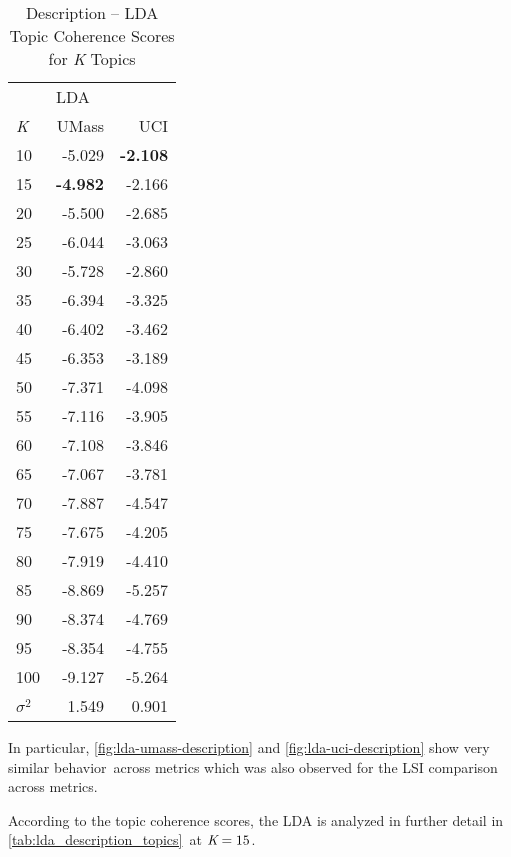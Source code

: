 \documentclass[letterpaper,12pt]{article}
\begin{document}
\begin{table}
	\caption{\label{tab:lda_description_tc} Description -- LDA Topic Coherence Scores for \emph{K} Topics}
	\begin{center}
		\begin{tabular}{lrr}
			\toprule
			{} & \multicolumn{2}{l}{LDA} \\
			\emph{K} &  UMass &    UCI \\
			\midrule
			10  & -5.029 & \textbf{-2.108} \\
			15  & \textbf{-4.982} & -2.166 \\
			20  & -5.500 & -2.685 \\
			25  & -6.044 & -3.063 \\
			30  & -5.728 & -2.860 \\
			35  & -6.394 & -3.325 \\
			40  & -6.402 & -3.462 \\
			45  & -6.353 & -3.189 \\
			50  & -7.371 & -4.098 \\
			55  & -7.116 & -3.905 \\
			60  & -7.108 & -3.846 \\
			65  & -7.067 & -3.781 \\
			70  & -7.887 & -4.547 \\
			75  & -7.675 & -4.205 \\
			80  & -7.919 & -4.410 \\
			85  & -8.869 & -5.257 \\
			90  & -8.374 & -4.769 \\
			95  & -8.354 & -4.755 \\
			100 & -9.127 & -5.264 \\
			\midrule
			$\sigma^2$ & 1.549 & 0.901 \\
			\bottomrule
			\end{tabular}
	\end{center}
\end{table}

In particular, \ref{fig:lda-umass-description} and \ref{fig:lda-uci-description} show very similar behavior\
across metrics which was also observed for the LSI comparison across metrics.


\newpage
According to the topic coherence scores, the LDA is analyzed in further detail in \ref{tab:lda_description_topics}\
at $\emph{K} = 15$.
\end{document}
